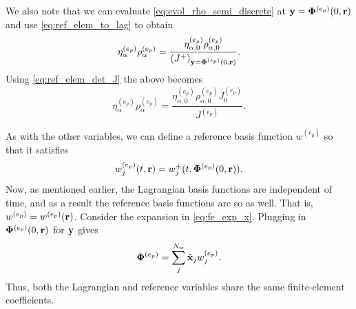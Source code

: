\documentclass[11pt]{report}
\begin{document}
We also note that we can evaluate \cref{eq:evol_rho_semi_discrete} at $\mathbf{y} = \bm \Phi^{(e_p)}(0,\mathbf{r})$ and use \cref{eq:ref_elem_to_lag} to obtain
\begin{equation*}
    \eta^{(e_p)}_\alpha \rho^{(e_p)}_\alpha = \frac{\eta^{(e_p)}_{\alpha,0} \rho^{(e_p)}_{\alpha,0}}{ \left( J^+ \right)_{\mathbf{y}=\bm \Phi^{(e_p)}(0,\mathbf{r})} }.
\end{equation*}
Using \cref{eq:ref_elem_det_J} the above becomes
\begin{equation*}
    \eta^{(e_p)}_\alpha \rho^{(e_p)}_\alpha = \frac{\eta^{(e_p)}_{\alpha,0} \rho^{(e_p)}_{\alpha,0} J^{(e_p)}_0}{J^{(e_p)}}.
\end{equation*}

As with the other variables, we can define a reference basis function $w^{(e_p)}$ so that it satisfies
\begin{equation}
    w_j^{(e_p)}(t,\mathbf{r}) = w_j^+(t,\bm \Phi^{(e_p)}(0,\mathbf{r})).
\end{equation}
Now, as mentioned earlier, the Lagrangian basis functions are independent of time, and as a result the reference basis functions are so as well. That is, $w^{(e_p)} = w^{(e_p)}(\mathbf{r})$. Consider the expansion in \cref{eq:fe_exp_x}. Plugging in $\bm \Phi^{(e_p)}(0,\mathbf{r})$ for $\mathbf{y}$ gives
\begin{equation}
    \label{eq:re_exp_x}
    \bm \Phi^{(e_p)} = \sum_j^{N_w} \hat{\mathbf{x}}_j w^{(e_p)}_j.
\end{equation}
Thus, both the Lagrangian and reference variables share the same finite-element coefficients.

\end{document}
